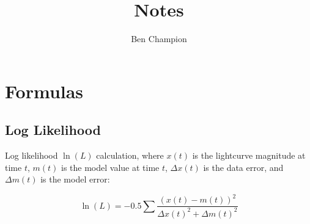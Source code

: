 \documentclass{article}
\author{Ben Champion}
\title{Notes}
\begin{document}
\maketitle

\section{Formulas}

\subsection{Log Likelihood}

Log likelihood $\ln(L)$ calculation, where $x(t)$ is the lightcurve magnitude at
time $t$, $m(t)$ is the model value at time $t$, $\Delta x(t)$ is the data
error, and $\Delta m(t)$ is the model error:

\begin{equation}
        \ln(L) = -0.5 \sum \frac {(x(t) - m(t))^2} {\Delta x(t)^2 + \Delta m(t)^2}
\end{equation}
\end{document}
